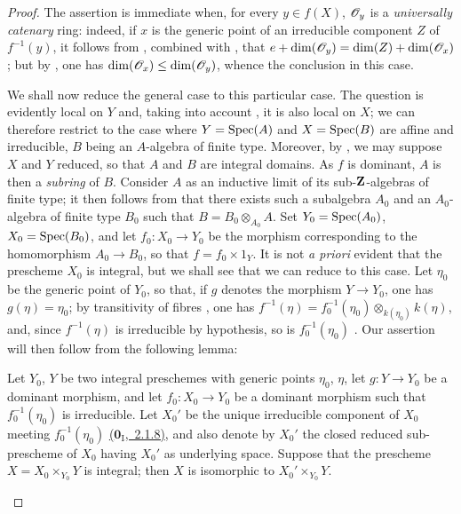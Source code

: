 \begin{proof}
The assertion is immediate when, for every $y\in f(X)$, $\mathscr{O}_y$ is a \emph{universally catenary} ring: indeed, if $x$ is the generic point of an irreducible component $Z$ of $f^{-1}(y)$, it follows from , combined with , that $e+\dim(\mathscr{O}_y)=\dim(Z)+\dim(\mathscr{O}_x)$; but by , one has $\dim(\mathscr{O}_x)\leq\dim(\mathscr{O}_y)$, whence the conclusion in this case.

We shall now reduce the general case to this particular case.
The question is evidently local on $Y$ and, taking into account , it is also local on $X$; we can therefore restrict to the case where $Y=\operatorname{Spec}(A)$ and $X=\operatorname{Spec}(B)$ are affine and irreducible, $B$ being an $A$-algebra of finite type.
Moreover, by , we may suppose $X$ and $Y$ reduced, so that $A$ and $B$ are integral domains.
As $f$ is dominant, $A$ is then a \emph{subring} of $B$.
Consider $A$ as an inductive limit of its sub-$\mathbf{Z}$-algebras of finite type; it then follows from  that there exists such a subalgebra $A_0$ and an $A_0$-algebra of finite type $B_0$ such that $B=B_0\otimes_{A_0}A$.
Set $Y_0=\operatorname{Spec}(A_0)$, $X_0=\operatorname{Spec}(B_0)$, and let $f_0:X_0\to Y_0$ be the morphism corresponding to the homomorphism $A_0\to B_0$, so that $f=f_0\times 1_Y$.
It is not \emph{a priori} evident that the prescheme $X_0$ is integral, but we shall see that we can reduce to this case.
Let $\eta_0$ be the generic point of $Y_0$, so that, if $g$ denotes the morphism $Y\to Y_0$, one has $g(\eta)=\eta_0$; by transitivity of fibres , one has $f^{-1}(\eta)=f_0^{-1}(\eta_0)\otimes_{k(\eta_0)}k(\eta)$, and, since $f^{-1}(\eta)$ is irreducible by hypothesis, so is $f_0^{-1}(\eta_0)$ .
Our assertion will then follow from the following lemma:

\begin{lemma}[13.1.2]
\label{IV.13.1.2}
Let $Y_0$, $Y$ be two integral preschemes with generic points $\eta_0$, $\eta$, let $g:Y\to Y_0$ be a dominant morphism, and let $f_0:X_0\to Y_0$ be a dominant morphism such that $f_0^{-1}(\eta_0)$ is irreducible.
Let $X_0'$ be the unique irreducible component of $X_0$ meeting $f_0^{-1}(\eta_0)$ \hyperref[0.2.1.8]{($\mathbf{0}_{\mathrm{I}}$,~2.1.8)}, and also denote by $X_0'$ the closed reduced sub-prescheme of $X_0$ having $X_0'$ as underlying space.
Suppose that the prescheme $X=X_0\times_{Y_0}Y$ is integral; then $X$ is isomorphic to $X_0'\times_{Y_0}Y$.
\end{lemma}


\end{proof}
